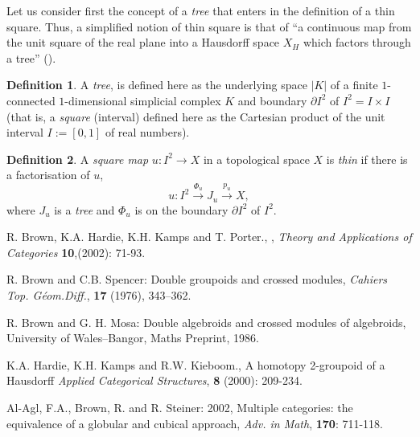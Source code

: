 \documentclass[12pt]{article}
\theoremstyle{plain}
\theoremstyle{definition}
\newtheorem{definition}{Definition}[section]
\numberwithin{equation}{section}
\begin{document}
Let us consider first the concept of a {\em tree} that enters in the definition of a thin square.
Thus, a simplified notion of thin square is that of ``a continuous map from the unit square of the real plane into
a Hausdorff space $X_H$ which factors through a tree'' (\cite{BHKP}).
 
\begin{definition}  
  A {\it tree}, is defined here as the underlying space $ |K| $ of a
finite $ 1 $-connected $ 1 $-dimensional simplicial complex $ K $ and
boundary $ \partial{I}^{2} $ of $ I^{2} = I \times I $ (that is, a \emph{square} (interval) defined here as the Cartesian product of the unit interval $I :=[0,1]$ of real numbers). 
\end{definition}


\begin{definition}
A \emph{square map} $ u:I^{2} \longrightarrow X $ in a topological space $ X $ is \emph{thin} if there 
is a factorisation of $ u $, $$ u : I^{2} \stackrel{\Phi_{u}}{\longrightarrow}
J_{u} \stackrel{p_{u}}{\longrightarrow} X, $$  where $J_{u}$ is a
\emph{tree} and $ \Phi_{u} $ is  on the
boundary $ \partial{I}^{2} $ of $ I^{2} $. 
\end{definition}

\begin{thebibliography}{9}

R. Brown, K.A. Hardie, K.H. Kamps and T. Porter.,
 ,
{\it Theory and Applications of Categories} \textbf{10},(2002): 71-93.

R. Brown and C.B. Spencer: Double groupoids and crossed modules, \emph{Cahiers Top. G\'eom.Diff.},
\textbf{17} (1976), 343--362.

R. Brown and G. H. Mosa: Double algebroids and crossed modules of algebroids, University of Wales--Bangor, Maths Preprint, 1986.

K.A. Hardie, K.H. Kamps and R.W. Kieboom., A homotopy 2-groupoid of a Hausdorff
\emph{Applied Categorical Structures}, \textbf{8} (2000): 209-234.

Al-Agl, F.A., Brown, R. and R. Steiner: 2002, Multiple categories: the equivalence of a globular and cubical approach, \emph{Adv. in Math}, \textbf{170}: 711-118.

\end{thebibliography}

\end{document}
